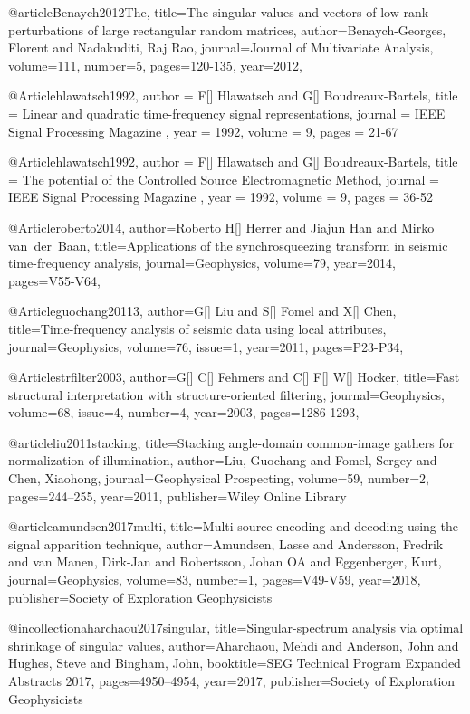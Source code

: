 @article{Benaych2012The,
  title={The singular values and vectors of low rank perturbations of large rectangular random matrices},
  author={Benaych-Georges, Florent and Nadakuditi, Raj Rao},
  journal={Journal of Multivariate Analysis},
  volume={111},
  number={5},
  pages={120-135},
  year={2012},
}


@Article{hlawatsch1992,
  author = 	 {F[] Hlawatsch and G[] Boudreaux-Bartels},
  title = 	 { Linear and quadratic time-frequency signal representations},
  journal = 	 { IEEE Signal Processing Magazine },
  year = 	 1992,
  volume = 	 9,
  pages = 	 {21-67}
}

@Article{hlawatsch1992,
  author = 	 {F[] Hlawatsch and G[] Boudreaux-Bartels},
  title = 	 {The potential of the Controlled Source Electromagnetic Method},
  journal = 	 { IEEE Signal Processing Magazine },
  year = 	 1992,
  volume = 	 9,
  pages = 	 {36-52}
}

@Article{roberto2014,
author={Roberto H[] Herrer and Jiajun Han and Mirko van~der~Baan},
title={Applications of the synchrosqueezing transform
in seismic time-frequency analysis},
journal={Geophysics},
volume=79,
year=2014,
pages={V55-V64},
}

@Article{guochang20113,
author={G[] Liu and S[] Fomel and X[] Chen},
title={Time-frequency analysis of seismic data using local attributes},
journal={Geophysics},
volume=76,
issue=1,
year=2011,
pages={P23-P34},
}

@Article{strfilter2003,
author={G[] C[] Fehmers and C[] F[] W[] Hocker},
title={Fast structural interpretation with structure-oriented filtering},
journal={Geophysics},
volume=68,
issue=4,
number=4,
year=2003,
pages={1286-1293},
}




@article{liu2011stacking,
  title={Stacking angle-domain common-image gathers for normalization of illumination},
  author={Liu, Guochang and Fomel, Sergey and Chen, Xiaohong},
  journal={Geophysical Prospecting},
  volume={59},
  number={2},
  pages={244--255},
  year={2011},
  publisher={Wiley Online Library}
}

@article{amundsen2017multi,
  title={Multi-source encoding and decoding using the signal apparition technique},
  author={Amundsen, Lasse and Andersson, Fredrik and van Manen, Dirk-Jan and Robertsson, Johan OA and Eggenberger, Kurt},
  journal={Geophysics},
  volume={83},
  number={1},
  pages={V49-V59},
  year={2018},
  publisher={Society of Exploration Geophysicists}
}


@incollection{aharchaou2017singular,
  title={Singular-spectrum analysis via optimal shrinkage of singular values},
  author={Aharchaou, Mehdi and Anderson, John and Hughes, Steve and Bingham, John},
  booktitle={SEG Technical Program Expanded Abstracts 2017},
  pages={4950--4954},
  year={2017},
  publisher={Society of Exploration Geophysicists}
}


